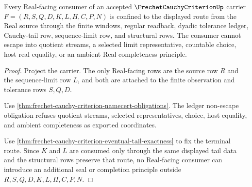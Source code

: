 \begin{theorem}
\label{thm:frechet-cauchy-criterion-real-seal-nonescape}
Every Real-facing consumer of an accepted $\FrechetCauchyCriterionUp$ carrier $F=(R,S,Q,D,K,L,H,C,P,N)$ is confined to the displayed route from the Real source through the finite windows, regular readback, dyadic tolerance ledger, Cauchy-tail row, sequence-limit row, and structural rows. The consumer cannot escape into quotient streams, a selected limit representative, countable choice, host real equality, or an ambient Real completeness principle.
\end{theorem}
\begin{proof}
Project the carrier. The only Real-facing rows are the source row $R$ and the sequence-limit row $L$, and both are attached to the finite observation and tolerance rows $S,Q,D$.

Use \autoref{thm:frechet-cauchy-criterion-namecert-obligations}. The ledger non-escape obligation refuses quotient streams, selected representatives, choice, host equality, and ambient completeness as exported coordinates.

Use \autoref{thm:frechet-cauchy-criterion-eventual-tail-exactness} to fix the terminal route. Since $K$ and $L$ are consumed only through the same displayed tail data and the structural rows preserve that route, no Real-facing consumer can introduce an additional seal or completion principle outside $R,S,Q,D,K,L,H,C,P,N$.
\end{proof}


\begin{closurestatus}{\FrechetCauchyCriterionUp}
  \theoryclosure{\seedClosure}
  \formalstatus{\theoremCheckedV}
\end{closurestatus}
